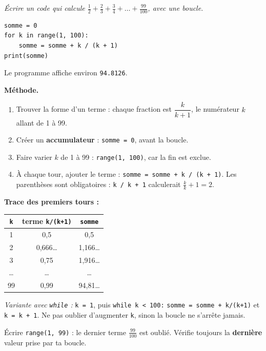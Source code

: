 \documentclass[addpoints, 11pt]{exam}
\newcommand{\enonce}[1]{\textit{#1}\par\smallskip}
\newcommand{\methode}{\par\smallskip\noindent\textbf{Méthode.}\ }
\newcommand{\code}[1]{\texttt{#1}}
\DeclareRobustCommand{\_}{\textunderscore\allowbreak}
\begin{document}
\begin{questions}
\question[3] \enonce{Écrire un code qui calcule $\frac{1}{2} + \frac{2}{3} + \frac{3}{4} + \dots + \frac{99}{100}$, avec une boucle.}
\begin{reponse}
\begin{lstlisting}
somme = 0
for k in range(1, 100):
    somme = somme + k / (k + 1)
print(somme)
\end{lstlisting}
Le programme affiche environ \code{94.8126}.
\end{reponse}
\methode
\begin{enumerate}
  \item Trouver la forme d'un terme : chaque fraction est $\dfrac{k}{k+1}$, le numérateur $k$ allant de 1 à 99.
  \item Créer un \textbf{accumulateur} : \code{somme = 0}, avant la boucle.
  \item Faire varier $k$ de 1 à 99 : \code{range(1, 100)}, car la fin est exclue.
  \item À chaque tour, ajouter le terme : \code{somme = somme + k / (k + 1)}. Les parenthèses sont obligatoires : \code{k / k + 1} calculerait $\frac{k}{k} + 1 = 2$.
\end{enumerate}
\textbf{Trace des premiers tours :}
\begin{center}
\begin{tabular}{|c|c|c|}
\hline
\code{k} & terme \code{k/(k+1)} & \code{somme} \\ \hline
1 & 0,5 & 0,5 \\
2 & 0,666\dots & 1,166\dots \\
3 & 0,75 & 1,916\dots \\
\dots & \dots & \dots \\
99 & 0,99 & 94,81\dots \\ \hline
\end{tabular}
\end{center}
\textit{Variante avec \code{while} :} \code{k = 1}, puis \code{while k < 100:} \code{somme = somme + k/(k+1)} et \code{k = k + 1}. Ne pas oublier d'augmenter \code{k}, sinon la boucle ne s'arrête jamais.

\begin{erreur}
Écrire \code{range(1, 99)} : le dernier terme $\frac{99}{100}$ est oublié. Vérifie toujours la \textbf{dernière} valeur prise par ta boucle.
\end{erreur}

\end{questions}
\end{document}
